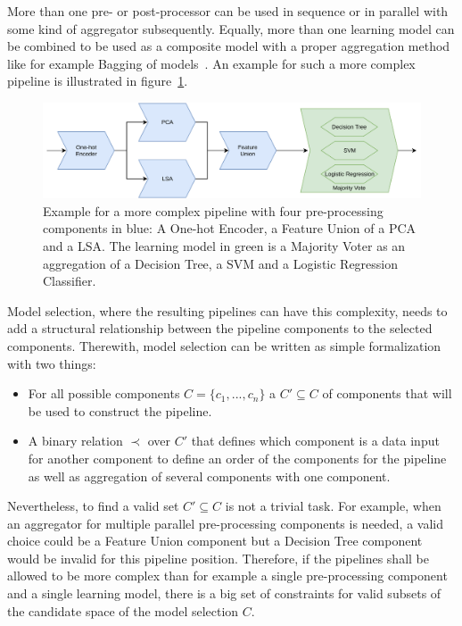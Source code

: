 More than one pre- or post-processor can be used in sequence or in parallel with some kind of aggregator subsequently.
Equally, more than one learning model can be combined to be used as a composite model with a proper aggregation method like for example Bagging of models~\cite{Breiman-BaggingPredictors}.
An example for such a more complex pipeline is illustrated in figure~\ref{fig:theory:complexPipeline}.
\begin{figure}[ht!]
    \centering
    \includegraphics[width=\textwidth]{gfx/Figures/Theory/ComplexPipeline.pdf}
    \caption{Example for a more complex pipeline with four pre-processing components in blue: A One-hot Encoder, a Feature Union of a PCA and a LSA. The learning model in green is a Majority Voter as an aggregation of a Decision Tree, a SVM and a Logistic Regression Classifier. }
	\label{fig:theory:complexPipeline}
\end{figure}

Model selection, where the resulting pipelines can have this complexity, needs to add a structural relationship between the pipeline components to the selected components.
Therewith, model selection can be written as simple formalization with two things:
\begin{itemize}
    \item For all possible components $C=\{c_1, ..., c_n\}$ a $C' \subseteq C$ of components that will be used to construct the pipeline.
    \item A binary relation $\prec$ over $C'$ that defines which component is a data input for another component to define an order of the components for the pipeline as well as aggregation of several components with one component. 
\end{itemize}
Nevertheless, to find a valid set $C' \subseteq C$ is not a trivial task.
For example, when an aggregator for multiple parallel pre-processing components is needed, a valid choice could be a Feature Union component but a Decision Tree component would be invalid for this pipeline position.
Therefore, if the pipelines shall be allowed to be more complex than for example a single pre-processing component and a single learning model, there is a big set of constraints for valid subsets of the candidate space of the model selection $C$.

